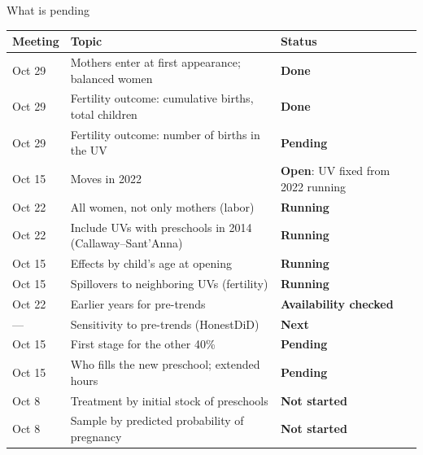 \documentclass[aspectratio=169,10pt]{beamer}
\newcommand{\takeaway}[1]{\par\vspace{6pt}{\small\textcolor{steel}{$\Rightarrow$}\ \textbf{\textcolor{navy}{#1}}}}
\begin{document}
\begin{frame}{What is pending}
\vspace{-4pt}
\begin{center}
\scriptsize
\renewcommand{\arraystretch}{0.95}
\setlength{\tabcolsep}{4pt}
\begin{tabular}{@{}l>{\raggedright\arraybackslash}p{6.6cm}>{\raggedright\arraybackslash}p{4.4cm}@{}}
\toprule
\textbf{Meeting} & \textbf{Topic} & \textbf{Status} \\
\midrule
Oct 29 & Mothers enter at first appearance; balanced women & \textcolor{statuslisto}{\textbf{Done}} \\
Oct 29 & Fertility outcome: cumulative births, total children & \textcolor{statuslisto}{\textbf{Done}} \\
Oct 29 & Fertility outcome: number of births in the UV & \textcolor{statusred}{\textbf{Pending}} \\
Oct 15 & Moves in 2022 & \textcolor{statuspink}{\textbf{Open}}: UV fixed from 2022 running \\
Oct 22 & All women, not only mothers (labor) & \textcolor{statuspink}{\textbf{Running}} \\
Oct 22 & Include UVs with preschools in 2014 (Callaway--Sant'Anna) & \textcolor{statuspink}{\textbf{Running}} \\
Oct 15 & Effects by child's age at opening & \textcolor{statuspink}{\textbf{Running}} \\
Oct 15 & Spillovers to neighboring UVs (fertility) & \textcolor{statuspink}{\textbf{Running}} \\
Oct 22 & Earlier years for pre-trends & \textcolor{statuspink}{\textbf{Availability checked}} \\
--- & Sensitivity to pre-trends (HonestDiD) & \textcolor{statusred}{\textbf{Next}} \\
Oct 15 & First stage for the other 40\% & \textcolor{statusred}{\textbf{Pending}} \\
Oct 15 & Who fills the new preschool; extended hours & \textcolor{statusred}{\textbf{Pending}} \\
Oct 8 & Treatment by initial stock of preschools & \textcolor{statusred}{\textbf{Not started}} \\
Oct 8 & Sample by predicted probability of pregnancy & \textcolor{statusred}{\textbf{Not started}} \\
\bottomrule
\end{tabular}
\end{center}
\takeaway{Sample changes are done; robustness is running; mechanisms and the 2022 jump come next.}
\end{frame}
\end{document}
